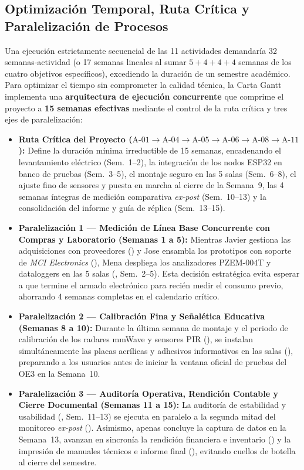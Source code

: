 \subsection{Optimización Temporal, Ruta Crítica y Paralelización de Procesos}
Una ejecución estrictamente secuencial de las 11 actividades demandaría 32 semanas-actividad (o 17 semanas lineales al sumar $5+4+4+4$ semanas de los cuatro objetivos específicos), excediendo la duración de un semestre académico. Para optimizar el tiempo sin comprometer la calidad técnica, la Carta Gantt implementa una \textbf{arquitectura de ejecución concurrente} que comprime el proyecto a \textbf{15 semanas efectivas} mediante el control de la ruta crítica y tres ejes de paralelización:

\begin{itemize}
    \item \textbf{Ruta Crítica del Proyecto ($\text{A-01} \rightarrow \text{A-04} \rightarrow \text{A-05} \rightarrow \text{A-06} \rightarrow \text{A-08} \rightarrow \text{A-11}$):} Define la duración mínima irreductible de 15 semanas, encadenando el levantamiento eléctrico (Sem.~1--2), la integración de los nodos ESP32 en banco de pruebas (Sem.~3--5), el montaje seguro en las 5 salas (Sem.~6--8), el ajuste fino de sensores y puesta en marcha al cierre de la Semana~9, las 4 semanas íntegras de medición comparativa \textit{ex-post} (Sem.~10--13) y la consolidación del informe y guía de réplica (Sem.~13--15).
    \item \textbf{Paralelización 1 --- Medición de Línea Base Concurrente con Compras y Laboratorio (Semanas 1 a 5):} Mientras Javier gestiona las adquisiciones con proveedores () y Jose ensambla los prototipos con soporte de \textit{MCI Electronics} (), Mena despliega los analizadores PZEM-004T y dataloggers en las 5 salas (, Sem.~2--5). Esta decisión estratégica evita esperar a que termine el armado electrónico para recién medir el consumo previo, ahorrando 4 semanas completas en el calendario crítico.
    \item \textbf{Paralelización 2 --- Calibración Fina y Señalética Educativa (Semanas 8 a 10):} Durante la última semana de montaje y el periodo de calibración de los radares mmWave y sensores PIR (), se instalan simultáneamente las placas acrílicas y adhesivos informativos en las salas (), preparando a los usuarios antes de iniciar la ventana oficial de pruebas del OE3 en la Semana~10.
    \item \textbf{Paralelización 3 --- Auditoría Operativa, Rendición Contable y Cierre Documental (Semanas 11 a 15):} La auditoría de estabilidad y usabilidad (, Sem.~11--13) se ejecuta en paralelo a la segunda mitad del monitoreo \textit{ex-post} (). Asimismo, apenas concluye la captura de datos en la Semana~13, avanzan en sincronía la rendición financiera e inventario () y la impresión de manuales técnicos e informe final (), evitando cuellos de botella al cierre del semestre.
\end{itemize}

